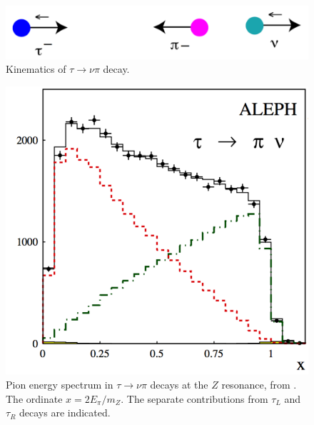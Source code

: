 \documentclass[12pt]{article}
\begin{document}
\begin{figure}
\begin{center}
\includegraphics[width=0.60\hsize]{taunupidecay.pdf}
\end{center}
\caption{Kinematics of $\tau\to \nu\pi$ decay.}
\label{fig:taunupi}
\end{figure}



\begin{figure}
\begin{center}
\includegraphics[width=0.60\hsize]{ALEPHtau.pdf}
\end{center}
\caption{Pion energy spectrum in $\tau\to \nu \pi$ decays at the $Z$
  resonance, from \cite{ALEPHtau}.  The ordinate $x =2 E_\pi/m_Z$.
  The separate contributions from $\tau_L$ and $\tau_R$ decays are indicated.}
\label{fig:ALEPHtau}
\end{figure}
\end{document}
